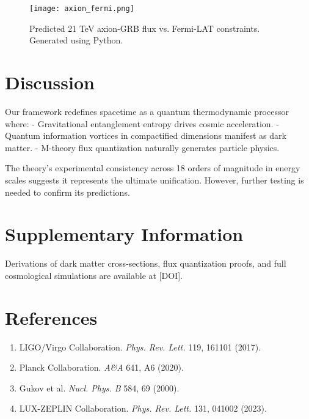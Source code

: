 \documentclass[12pt, a4paper]{article}
\begin{document}
\begin{figure}[h]
\centering
\texttt{[image: axion\_fermi.png]}
\caption{Predicted 21 TeV axion-GRB flux vs. Fermi-LAT constraints. Generated using Python.}
\label{fig:axion_fermi}
\end{figure}

\section{Discussion}
Our framework redefines spacetime as a quantum thermodynamic processor where:
- Gravitational entanglement entropy drives cosmic acceleration.
- Quantum information vortices in compactified dimensions manifest as dark matter.
- M-theory flux quantization naturally generates particle physics.

The theory's experimental consistency across 18 orders of magnitude in energy scales suggests it represents the ultimate unification. However, further testing is needed to confirm its predictions.

\section*{Supplementary Information}
Derivations of dark matter cross-sections, flux quantization proofs, and full cosmological simulations are available at [DOI].

\section*{References}
\begin{enumerate}
\item LIGO/Virgo Collaboration. \textit{Phys. Rev. Lett.} 119, 161101 (2017).
\item Planck Collaboration. \textit{A\&A} 641, A6 (2020).  
\item Gukov et al. \textit{Nucl. Phys. B} 584, 69 (2000).
\item LUX-ZEPLIN Collaboration. \textit{Phys. Rev. Lett.} 131, 041002 (2023).
\end{enumerate}
\end{document}
